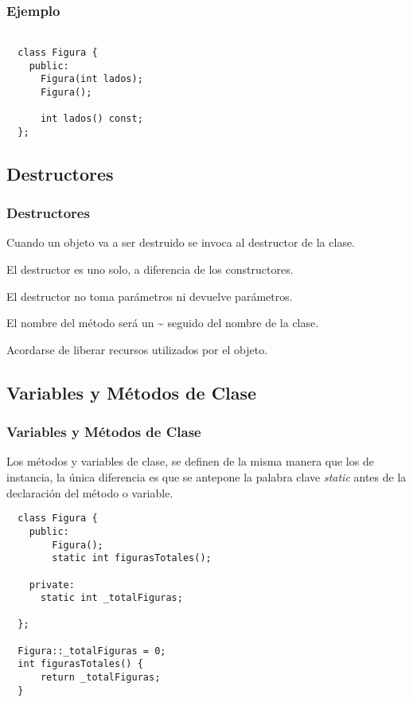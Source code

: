 \documentclass{beamer}
\begin{document}
\begin{frame}[fragile]
\frametitle{Ejemplo}
\begin{verbatim}
 
  class Figura {
    public:
      Figura(int lados);
      Figura();

      int lados() const;
  };
\end{verbatim}

\end{frame}

%
%

\subsection{Destructores}
\begin{frame}
\frametitle{Destructores}

Cuando un objeto va a ser destruido se invoca al destructor de la clase.

El destructor es uno solo, a diferencia de los constructores. 

El destructor no toma parámetros ni devuelve parámetros.

El nombre del método será un \~{ } seguido del nombre de la clase.

\begin{block}{}
Acordarse de liberar recursos utilizados por el objeto.
\end{block}

\end{frame}

\subsection{Variables y Métodos de Clase}
\begin{frame}[fragile]
\frametitle{Variables y Métodos de Clase}
   Los métodos y variables de clase, se definen de la misma manera que los de instancia, la única diferencia
   es que se antepone la palabra clave \emph{static} antes de la declaración del método o variable. \\
\end{frame}

\begin{frame}[fragile]
\begin{verbatim}
  class Figura {
    public:
        Figura();
        static int figurasTotales();

    private:
      static int _totalFiguras;

  };

  Figura::_totalFiguras = 0;
  int figurasTotales() {
      return _totalFiguras;
  }
\end{verbatim}

\end{frame}
\end{document}
